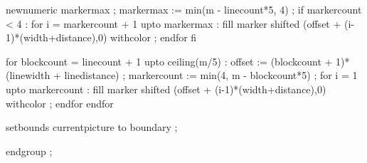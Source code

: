   newnumeric markermax ; markermax := min(m - linecount*5, 4) ;
  if markercount < 4 :
    for i = markercount + 1 upto markermax : 
        fill marker shifted (offset + (i-1)*(width+distance),0)
        withcolor 
             ;
    endfor
  fi

  for blockcount = linecount + 1 upto ceiling(m/5) :
    offset := (blockcount + 1)*(linewidth + linedistance) ;
    markercount := min(4, m - blockcount*5) ;
    for i = 1 upto markercount :
      fill marker shifted (offset + (i-1)*(width+distance),0)
        withcolor 
             ;
    endfor
  endfor

  setbounds currentpicture to boundary ;

  endgroup ;

\stopuseMPgraphic


\protect

\stopmodule

